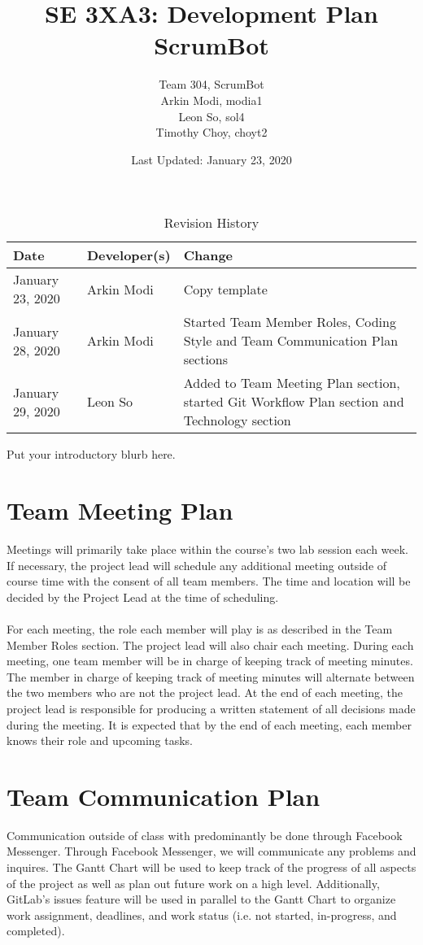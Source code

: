 \documentclass{article}
\title{SE 3XA3: Development Plan\\ScrumBot}
\author{
    Team 304, ScrumBot
        \\ Arkin Modi, modia1
        \\ Leon So, sol4
        \\ Timothy Choy, choyt2
}
\date{Last Updated: January 23, 2020}
\begin{document}
\begin{table}[hp]
    \caption{Revision History} \label{TblRevisionHistory}
    \begin{tabularx}{\textwidth}{llX}
        \toprule
            \textbf{Date} & \textbf{Developer(s)} & \textbf{Change}\\
        \midrule
            January 23, 2020 & Arkin Modi & Copy template\\
            January 28, 2020 & Arkin Modi & Started Team Member Roles, Coding Style and Team Communication Plan sections\\
            January 29, 2020 & Leon So & Added to Team Meeting Plan section, started Git Workflow Plan section and Technology section\\
        \bottomrule
    \end{tabularx}
\end{table}

\newpage

\maketitle

Put your introductory blurb here.

\section{Team Meeting Plan}
Meetings will primarily take place within the course's two lab session each week. If necessary, the project lead will schedule any additional meeting outside of course time with the consent of all team members. The time and location will be decided by the Project Lead at the time of scheduling. 
\\\\
\noindent For each meeting, the role each member will play is as described in the Team Member Roles section. The project lead will also chair each meeting. During each meeting, one team member will be in charge of keeping track of meeting minutes. The member in charge of keeping track of meeting minutes will alternate between the two members who are not the project lead. At the end of each meeting, the project lead is responsible for producing a written statement of all decisions made during the meeting. It is expected that by the end of each meeting, each member knows their role and upcoming tasks.

\section{Team Communication Plan}
Communication outside of class with predominantly be done through Facebook Messenger. Through Facebook Messenger, we will communicate any problems and inquires. The Gantt Chart will be used to keep track of the progress of all aspects of the project as well as plan out future work on a high level. Additionally, GitLab's issues feature will be used in parallel to the Gantt Chart to organize work assignment, deadlines, and work status (i.e. not started, in-progress, and completed).
\end{document}
